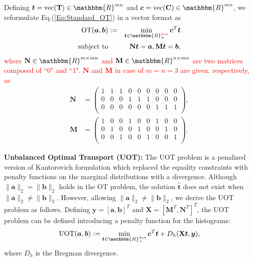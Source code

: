 \documentclass[twoside]{article}
\theoremstyle{plain}
\newcommand{\tranT}{T}
\newcommand{\R}{\mathbbm{R}}
\newcommand{\mat}[1]{\mathbf{#1}}
\renewcommand{\vec}[1]{\bm{#1}}
\newcommand{\changeHK}[1]{\textcolor{red}{#1}}
\begin{document}
Defining $\vec{t} = \text{vec}({\mat{T}}) \in \mathbbm{R}^{mn}$ and $\vec{c} = \text{vec}({\mat{C}}) \in \mathbbm{R}^{mn}$, we reformulate Eq.(\ref{Eq:Standard_OT}) in a vector format as
\begin{eqnarray}
\label{Eq:Vector_OT}
\operatorname{OT}(\vec{a},\vec{b}) &:=& \min_{\vec{t} \in \R_{+}^{\changeHK{mn}}} \vec{c}^{\tranT}\vec{t} \\
\text{subject\ to}&& \mat{N}\vec{t} = \vec{a}, \mat{M}\vec{t} = \vec{b}, \notag
\end{eqnarray}
\changeHK{where $\mat{N} \in \R^{m \times mn}$ and $\mat{M} \in \R^{n \times mn}$ are two matrices composed of ``0" and ``1". $\mat{N}$ and $\mat{M}$ in case of $m=n=3$ are given, respectively, as}
\begin{equation*}
\begin{split}
\mat{N}&=\begin{pmatrix}
1&1&1& 0& 0& 0& 0& 0&0\\
0 & 0& 0&1&1&1& 0& 0&0\\
0 & 0& 0& 0& 0& 0&1&1&1\\
\end{pmatrix},\\
\mat{M}&=\begin{pmatrix}
 1& 0& 0&1& 0& 0&1& 0&0\\
 0&1& 0& 0&1& 0& 0&1&0\\
 0& 0&1& 0& 0&1& 0& 0&1\\
 \end{pmatrix}.
  \end{split}
 \end{equation*}
 
{\bf Unbalanced Optimal Transport (UOT):} The UOT problem is a penalized version of Kantorovich formulation which replaced the equality constraints with penalty functions on the marginal distributions with a divergence. 
Although $\|\vec{a}\|_2 = \|\vec{b}\|_2$ holds in the OT problem, the solution $\hat{\vec{t}}$ does not exist when $\|\vec{a}\|_2 \neq \|\vec{b}\|_2$. However, allowing $\|\vec{a}\|_2 \neq \|\vec{b}\|_2$, we derive the UOT problem as follows. Defining $\vec{y} = [\vec{a}, \vec{b}]^{\tranT}$ and $\mat{X} = [\mat{M}^{\tranT},\mat{N}^{\tranT}]^{\tranT}$, the UOT problem can be defined introducing a penalty function for the histograms: 
\begin{equation}
\label{eq:uot}
\operatorname{UOT}(\vec{a},\vec{b}) := \min_{\vec{t} \in \R_{+}^{mn}} \vec{c}^{\tranT}\vec{t} + D_h(\mat{X}\vec{t},\vec{y}),
\end{equation}
where $D_h$ is the Bregman divergence. 
\end{document}
